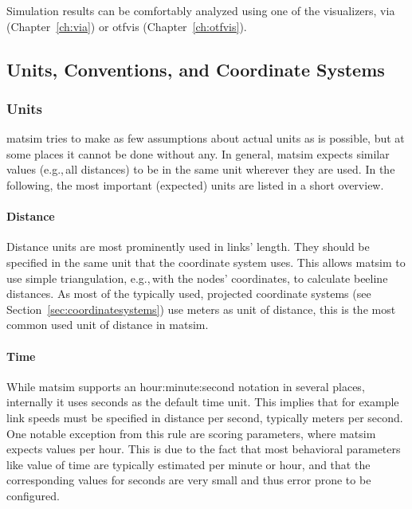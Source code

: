Simulation results can be comfortably analyzed using one of the visualizers, via (Chapter~\ref{ch:via}) or \gls{otfvis} (Chapter~\ref{ch:otfvis}).

\subsection{Units, Conventions, and Coordinate Systems}
\label{sec:unitsconventions}
\subsubsection{Units}
\gls{matsim} tries to make as few assumptions about actual units as is possible, but at some places it cannot be done without any. In general, \gls{matsim} expects similar values (e.g.,\,all distances) to be in the same unit wherever they are used. In the following, the most important (expected) units are listed in a short overview. 

\paragraph{Distance}

Distance units are most prominently used in links' length. They should be specified in the same unit that the coordinate system uses. This allows \gls{matsim} to use simple triangulation, e.g.,\,with the nodes' coordinates, to calculate beeline distances. As most of the typically used, projected coordinate systems (see Section~\ref{sec:coordinatesystems}) use meters as unit of distance, this is the most common used unit of distance in \gls{matsim}. 

\paragraph{Time}

While \gls{matsim} supports an hour:minute:second notation in several places, internally it uses seconds as the default time unit. This implies that for example link speeds must be specified in distance per second, typically meters per second. One notable exception from this rule are scoring parameters, where \gls{matsim} expects values per hour. This is due to the fact that most behavioral parameters like value of time are typically estimated per minute or hour, and that the corresponding values for seconds are very small and thus error prone to be configured. 

